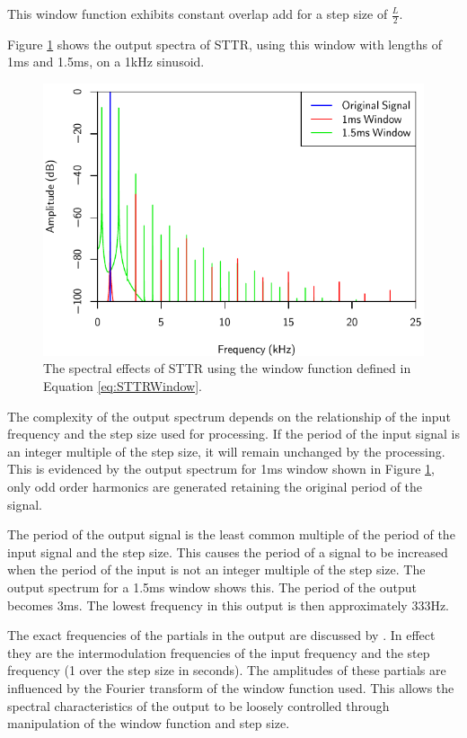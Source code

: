 			This window function exhibits constant overlap add for a step size of $\frac{L}{2}$.

			Figure \ref{fig:STTRSpectra} shows the output spectra of STTR, using this window with lengths of
			1ms and 1.5ms, on a 1kHz sinusoid.

			\begin{figure}[h!]
				\centering
				\includegraphics{chapter5/Images/STTRSpectra.pdf}
				\caption{The spectral effects of STTR using the window function defined in Equation
				         \ref{eq:STTRWindow}.}
				\label{fig:STTRSpectra}
			\end{figure}

			The complexity of the output spectrum depends on the relationship of the input frequency and the
			step size used for processing. If the period of the input signal is an integer multiple of the step
			size, it will remain unchanged by the processing. This is evidenced by the output spectrum for 1ms
			window shown in Figure \ref{fig:STTRSpectra}, only odd order harmonics are generated retaining the
			original period of the signal.

			The period of the output signal is the least common multiple of the period of the input signal and
			the step size. This causes the period of a signal to be increased when the period of the input is
			not an integer multiple of the step size. The output spectrum for a 1.5ms window shows this. The
			period of the output becomes 3ms. The lowest frequency in this output is then approximately 333Hz.

			The exact frequencies of the partials in the output are discussed by \citet{kim2014shorttime}. In
			effect they are the intermodulation frequencies of the input frequency and the step frequency (1
			over the step size in seconds). The amplitudes of these partials are influenced by the Fourier
			transform of the window function used. This allows the spectral characteristics of the output to be
			loosely controlled through manipulation of the window function and step size.

